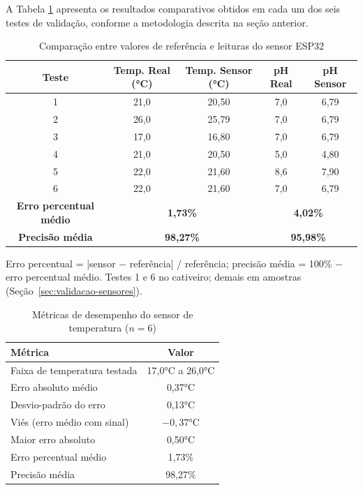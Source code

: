 \documentclass[11pt,a4paper]{article}
\begin{document}
A Tabela \ref{tab:sensores} apresenta os resultados comparativos obtidos em cada um dos seis testes de validação, conforme a metodologia descrita na seção anterior.

\begin{table}[H]
\centering
\caption{Comparação entre valores de referência e leituras do sensor ESP32}
\label{tab:sensores}

\small
\setlength{\tabcolsep}{5pt}
\begin{tabular}{ccccc}
\hline
\textbf{Teste} & \textbf{Temp. Real (°C)} & \textbf{Temp. Sensor (°C)} & \textbf{pH Real} & \textbf{pH Sensor} \\
\hline
1 & 21,0 & 20,50 & 7,0 & 6,79 \\
2 & 26,0 & 25,79 & 7,0 & 6,79 \\
3 & 17,0 & 16,80 & 7,0 & 6,79 \\
4 & 21,0 & 20,50 & 5,0 & 4,80 \\
5 & 22,0 & 21,60 & 8,6 & 7,90 \\
6 & 22,0 & 21,60 & 7,0 & 6,79 \\
\hline
\textbf{Erro percentual médio} & \multicolumn{2}{c}{\textbf{1,73\%}} & \multicolumn{2}{c}{\textbf{4,02\%}} \\
\textbf{Precisão média} & \multicolumn{2}{c}{\textbf{98,27\%}} & \multicolumn{2}{c}{\textbf{95,98\%}} \\
\hline
\end{tabular}

\vspace{2mm}
{\small Erro percentual = |sensor $-$ referência| / referência; precisão média = 100\% $-$ erro percentual médio. Testes 1 e 6 no cativeiro; demais em amostras (Seção~\ref{sec:validacao-sensores}).}

\end{table}

\begin{table}[H]
\centering
\caption{Métricas de desempenho do sensor de temperatura ($n = 6$)}
\label{tab:metricas-temperatura}
\small
\begin{tabular}{lc}
\hline
\textbf{Métrica} & \textbf{Valor} \\
\hline
Faixa de temperatura testada & 17,0°C a 26,0°C \\
Erro absoluto médio & 0,37°C \\
Desvio-padrão do erro & 0,13°C \\
Viés (erro médio com sinal) & $-0{,}37$°C \\
Maior erro absoluto & 0,50°C \\
Erro percentual médio & 1,73\% \\
Precisão média & 98,27\% \\
\hline
\end{tabular}
\end{table}
\end{document}
